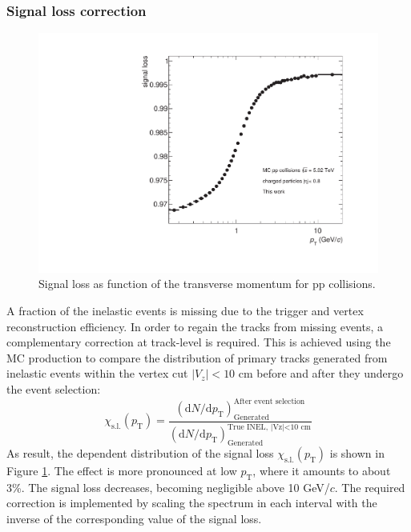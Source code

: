 \documentclass[12pt,a4paper]{report}
\begin{document}
\subsubsection{Signal loss correction}
\begin{figure}[tb!]
\centering
\includegraphics[width=12cm]{Plots/signalLoss.pdf}  
\caption{Signal loss as function of the transverse momentum for pp collisions.}
\label{sigLoss}
\end{figure}
A fraction of the inelastic events is missing due to the trigger and vertex reconstruction efficiency. In order to regain the tracks from missing events, a complementary correction at track-level is required. This is achieved using the MC production to compare the distribution of primary tracks generated from inelastic events within the vertex cut $|V_z| < 10$ cm before and after they undergo the event selection:
\begin{equation}
\chi_\text{s.l.}(p_\text{T}) = \dfrac{(\text{d}N/\text{d}p_\text{T})_\text{Generated}^\text{After event selection}}{(\text{d}N/\text{d}p_\text{T})_\text{Generated}^\text{True INEL, |Vz|<10 cm}}
\end{equation}
As result, the \pt dependent distribution of the signal loss $\chi_\text{s.l.}(p_\text{T})$ is shown in Figure \ref{sigLoss}. The effect is more pronounced at low $p_\text{T}$, where it amounts to about 3\%. The signal loss decreases, becoming negligible above 10 GeV/$c$. The required correction is implemented by scaling the \pt spectrum in each \pt interval with the inverse of the corresponding value of the signal loss.
\end{document}
